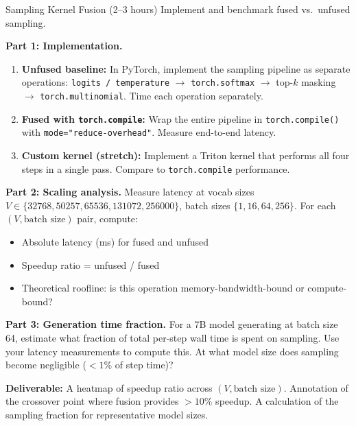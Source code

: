 \begin{exercise}{Sampling Kernel Fusion (2--3 hours)}
Implement and benchmark fused vs.\ unfused sampling.

\textbf{Part 1: Implementation.}
\begin{enumerate}
  \item \textbf{Unfused baseline:} In PyTorch, implement the sampling pipeline as separate operations: \texttt{logits / temperature} $\to$ \texttt{torch.softmax} $\to$ top-$k$ masking $\to$ \texttt{torch.multinomial}. Time each operation separately.
  \item \textbf{Fused with \texttt{torch.compile}:} Wrap the entire pipeline in \texttt{torch.compile()} with \texttt{mode="reduce-overhead"}. Measure end-to-end latency.
  \item \textbf{Custom kernel (stretch):} Implement a Triton kernel that performs all four steps in a single pass. Compare to \texttt{torch.compile} performance.
\end{enumerate}

\textbf{Part 2: Scaling analysis.} Measure latency at vocab sizes $V \in \{32768, 50257, 65536, 131072, 256000\}$, batch sizes $\{1, 16, 64, 256\}$. For each $(V, \text{batch size})$ pair, compute:
\begin{itemize}
  \item Absolute latency (ms) for fused and unfused
  \item Speedup ratio = unfused / fused
  \item Theoretical roofline: is this operation memory-bandwidth-bound or compute-bound?
\end{itemize}

\textbf{Part 3: Generation time fraction.} For a 7B model generating at batch size 64, estimate what fraction of total per-step wall time is spent on sampling. Use your latency measurements to compute this. At what model size does sampling become negligible ($< 1\%$ of step time)?

\textbf{Deliverable:} A heatmap of speedup ratio across $(V, \text{batch size})$. Annotation of the crossover point where fusion provides $> 10\%$ speedup. A calculation of the sampling fraction for representative model sizes.
\end{exercise}

